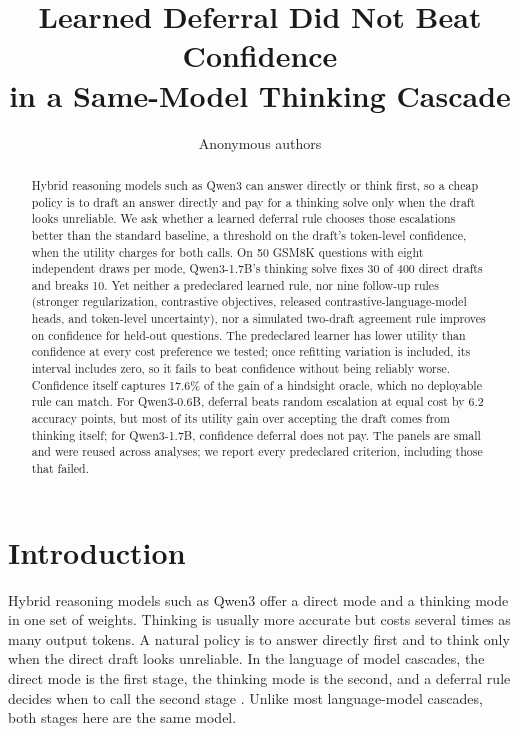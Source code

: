 \documentclass[10pt,letterpaper]{article}
\title{Learned Deferral Did Not Beat Confidence\\in a Same-Model Thinking Cascade}
\author{Anonymous authors}
\date{}
\begin{document}
\maketitle

\begin{abstract}
Hybrid reasoning models such as Qwen3 can answer directly or think first, so a cheap policy is to draft an answer directly and pay for a thinking solve only when the draft looks unreliable. We ask whether a learned deferral rule chooses those escalations better than the standard baseline, a threshold on the draft's token-level confidence, when the utility charges for both calls. On 50 GSM8K questions with eight independent draws per mode, Qwen3-1.7B's thinking solve fixes 30 of 400 direct drafts and breaks 10. Yet neither a predeclared learned rule, nor nine follow-up rules (stronger regularization, contrastive objectives, released contrastive-language-model heads, and token-level uncertainty), nor a simulated two-draft agreement rule improves on confidence for held-out questions. The predeclared learner has lower utility than confidence at every cost preference we tested; once refitting variation is included, its interval includes zero, so it fails to beat confidence without being reliably worse. Confidence itself captures 17.6\% of the gain of a hindsight oracle, which no deployable rule can match. For Qwen3-0.6B, deferral beats random escalation at equal cost by 6.2 accuracy points, but most of its utility gain over accepting the draft comes from thinking itself; for Qwen3-1.7B, confidence deferral does not pay. The panels are small and were reused across analyses; we report every predeclared criterion, including those that failed.
\end{abstract}

\section{Introduction}

Hybrid reasoning models such as Qwen3 \citep{qwen2025qwen3} offer a direct mode and a thinking mode in one set of weights. Thinking is usually more accurate but costs several times as many output tokens. A natural policy is to answer directly first and to think only when the direct draft looks unreliable. In the language of model cascades, the direct mode is the first stage, the thinking mode is the second, and a deferral rule decides when to call the second stage \citep{chen2023frugalgpt,jitkrittum2023cascade}. Unlike most language-model cascades, both stages here are the same model.
\end{document}

